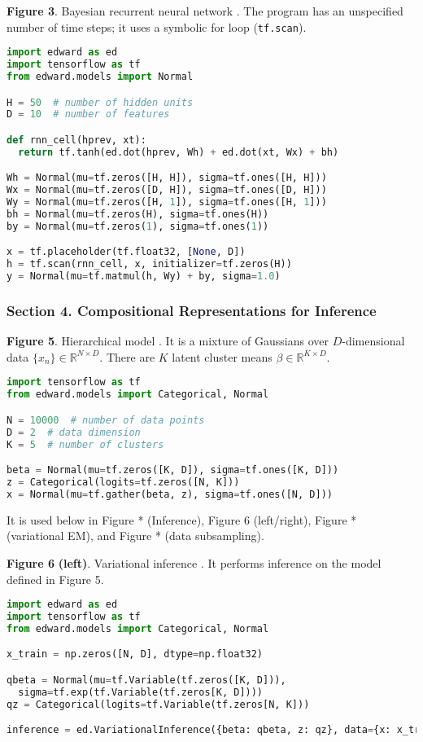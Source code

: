 \textbf{Figure 3}. Bayesian recurrent neural network \citep{neal2012bayesian}.
The program has an unspecified number of time steps; it uses a
symbolic for loop (\texttt{tf.scan}).
\begin{lstlisting}[language=python]
import edward as ed
import tensorflow as tf
from edward.models import Normal

H = 50  # number of hidden units
D = 10  # number of features

def rnn_cell(hprev, xt):
  return tf.tanh(ed.dot(hprev, Wh) + ed.dot(xt, Wx) + bh)

Wh = Normal(mu=tf.zeros([H, H]), sigma=tf.ones([H, H]))
Wx = Normal(mu=tf.zeros([D, H]), sigma=tf.ones([D, H]))
Wy = Normal(mu=tf.zeros([H, 1]), sigma=tf.ones([H, 1]))
bh = Normal(mu=tf.zeros(H), sigma=tf.ones(H))
by = Normal(mu=tf.zeros(1), sigma=tf.ones(1))

x = tf.placeholder(tf.float32, [None, D])
h = tf.scan(rnn_cell, x, initializer=tf.zeros(H))
y = Normal(mu=tf.matmul(h, Wy) + by, sigma=1.0)
\end{lstlisting}

\subsubsection{Section 4. Compositional Representations for Inference}

\textbf{Figure 5}. Hierarchical model \citep{gelman2006data}.
  It is a mixture of Gaussians over
  $D$-dimensional data $\{x_n\}\in\mathbb{R}^{N\times D}$. There are
  $K$ latent cluster means $\beta\in\mathbb{R}^{K\times D}$.
\begin{lstlisting}[language=python]
import tensorflow as tf
from edward.models import Categorical, Normal

N = 10000  # number of data points
D = 2  # data dimension
K = 5  # number of clusters

beta = Normal(mu=tf.zeros([K, D]), sigma=tf.ones([K, D]))
z = Categorical(logits=tf.zeros([N, K]))
x = Normal(mu=tf.gather(beta, z), sigma=tf.ones([N, D]))
\end{lstlisting}
It is used below in Figure * (Inference), Figure 6 (left/right),
Figure * (variational EM), and Figure * (data subsampling).

\textbf{Figure 6} \textbf{(left)}. Variational inference
\citep{jordan1999introduction}.
It performs inference on the model defined in Figure 5.
\begin{lstlisting}[language=python]
import edward as ed
import tensorflow as tf
from edward.models import Categorical, Normal

x_train = np.zeros([N, D], dtype=np.float32)

qbeta = Normal(mu=tf.Variable(tf.zeros([K, D])),
  sigma=tf.exp(tf.Variable(tf.zeros[K, D])))
qz = Categorical(logits=tf.Variable(tf.zeros[N, K]))

inference = ed.VariationalInference({beta: qbeta, z: qz}, data={x: x_train})
\end{lstlisting}


